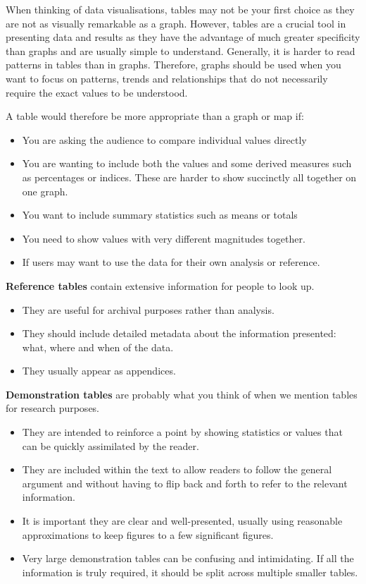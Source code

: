 \documentclass[
]{book}
\providecommand{\tightlist}{%
  \setlength{\itemsep}{0pt}\setlength{\parskip}{0pt}}
\begin{document}
When thinking of data visualisations, tables may not be your first choice as they are not as visually remarkable as a graph. However, tables are a crucial tool in presenting data and results as they have the advantage of much greater specificity than graphs and are usually simple to understand. Generally, it is harder to read patterns in tables than in graphs. Therefore, graphs should be used when you want to focus on patterns, trends and relationships that do not necessarily require the exact values to be understood.

A table would therefore be more appropriate than a graph or map if:

\begin{itemize}
\item
  You are asking the audience to compare individual values directly
\item
  You are wanting to include both the values and some derived measures such as percentages or indices. These are harder to show succinctly all together on one graph.
\item
  You want to include summary statistics such as means or totals
\item
  You need to show values with very different magnitudes together.
\item
  If users may want to use the data for their own analysis or reference.
\end{itemize}

\textbf{Reference tables} contain extensive information for people to look up.

\begin{itemize}
\tightlist
\item
  They are useful for archival purposes rather than analysis.
\item
  They should include detailed metadata about the information presented: what, where and when of the data.
\item
  They usually appear as appendices.
\end{itemize}

\textbf{Demonstration tables} are probably what you think of when we mention tables for research purposes.

\begin{itemize}
\item
  They are intended to reinforce a point by showing statistics or values that can be quickly assimilated by the reader.
\item
  They are included within the text to allow readers to follow the general argument and without having to flip back and forth to refer to the relevant information.
\item
  It is important they are clear and well-presented, usually using reasonable approximations to keep figures to a few significant figures.
\item
  Very large demonstration tables can be confusing and intimidating. If all the information is truly required, it should be split across multiple smaller tables.
\end{itemize}
\end{document}
